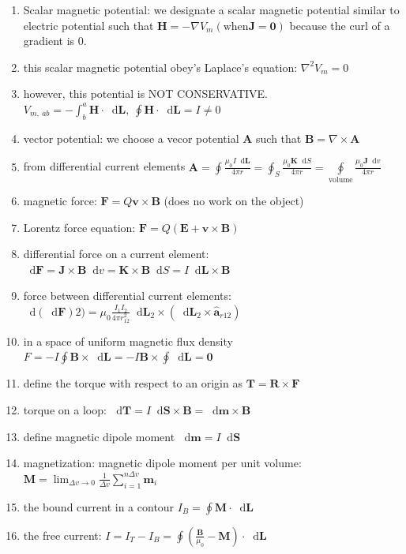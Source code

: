 \documentclass[a4paper,11pt]{article}
\newcommand*\dd{\mathop{}\!\mathrm{d}}
\newcommand{\grad}{\nabla}
\newcommand{\curl}{\nabla \times}
\newcommand{\bvec}[1]{\mathbf{#1}}
\newcommand{\uvec}[1]{\hat{\mathbf{a}}_{#1} }
\begin{document}
\begin{enumerate}
		\item Scalar magnetic potential: we designate a scalar magnetic potential similar to electric potential such that $\bvec{H} = -\grad V_m (\text{when} \bvec{J} = \bvec{0})$ because the curl of a gradient is $0$. 
		\item this scalar magnetic potential obey's Laplace's equation: $\grad^2 V_m = 0$
		\item however, this potential is NOT CONSERVATIVE. $V_{m,~ab} = -\int_{b}^{a} \bvec{H} \cdot\dd\bvec{L},~\oint\bvec{H}\cdot\dd\bvec{L} = I \neq 0$
		\item vector potential: we choose a vecor potential $\bvec{A}$ such that $\bvec{B} = \curl \bvec{A}$ 
		\item from differential current elements $\bvec{A} = \oint \frac{\mu_0 I \dd \bvec{L}}{4\pi r} = \oint_S \frac{\mu_0 \bvec{K} \dd S}{4\pi r} = \oint\limits_\text{volume} \frac{\mu_0 \bvec{J} \dd v}{4\pi r}$
		\item magnetic force: $\bvec{F} = Q\bvec{v}\times\bvec{B}$ (does no work on the object)
		\item Lorentz force equation: $\bvec{F} = Q(\bvec{E} + \bvec{v}\times\bvec{B})$
		\item differential force on a current element: $\dd\bvec{F} = \bvec{J}\times\bvec{B} \dd v = \bvec{K}\times\bvec{B} \dd S = I\dd\bvec{L}\times\bvec{B}$
		\item force between differential current elements: $\dd(\dd\bvec{F})2) = \mu_0 \frac{I_1I_2}{4\pi r_{12}^2} \dd\bvec{L}_2 \times (\dd\bvec{L}_2 \times \uvec{r12})$
		\item in a space of uniform magnetic flux density $F = -I\oint\bvec{B}\times\dd\bvec{L} = -I\bvec{B}\times\oint\dd\bvec{L} = \bvec{0}$
		\item define the torque with respect to an origin as $\bvec{T} = \bvec{R}\times\bvec{F}$
		\item torque on a loop: $\dd\bvec{T} = I\dd\bvec{S}\times\bvec{B} = \dd\bvec{m}\times\bvec{B}$
		\item define magnetic dipole moment $\dd\bvec{m} = I\dd\bvec{S}$
		\item magnetization: magnetic dipole moment per unit volume: $\bvec{M} = \lim_{\Delta v \to 0}\frac{1}{\Delta v}\sum_{i=1}^{n\Delta v} \bvec{m}_i$
		\item the bound current in a contour $I_B = \oint \bvec{M}\cdot\dd\bvec{L}$
		\item the free current: $I = I_T - I_B = \oint \left(\frac{\bvec{B}}{\mu_0} - \bvec{M}\right)\cdot\dd\bvec{L}$

\end{enumerate}
\end{document}
